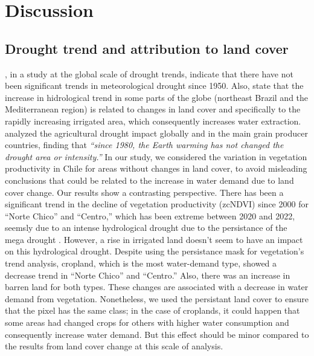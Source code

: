 \documentclass[
  authoryear,
  preprint,
  3p,
  onecolumn]{elsarticle}
\begin{document}
\hypertarget{discussion}{%
\section{Discussion}\label{discussion}}

\hypertarget{drought-trend-and-attribution-to-land-cover}{%
\subsection{Drought trend and attribution to land
cover}\label{drought-trend-and-attribution-to-land-cover}}

\citet{Vicente-Serrano2022}, in a study at the global scale of drought
trends, indicate that there have not been significant trends in
meteorological drought since 1950. Also, state that the increase in
hidrological trend in some parts of the globe (northeast Brazil and the
Mediterranean region) is related to changes in land cover and
specifically to the rapidly increasing irrigated area, which
consequently increases water extraction. \citet{Kogan2020} analyzed the
agricultural drought impact globally and in the main grain producer
countries, finding that \emph{``since 1980, the Earth warming has not
changed the drought area or intensity.''} In our study, we considered
the variation in vegetation productivity in Chile for areas without
changes in land cover, to avoid misleading conclusions that could be
related to the increase in water demand due to land cover change. Our
results show a contrasting perspective. There has been a significant
trend in the decline of vegetation productivity (zcNDVI) since 2000 for
``Norte Chico'' and ``Centro,'' which has been extreme between 2020 and
2022, seemsly due to an intense hydrological drought due to the
persistance of the mega drought \citep{Garreaud2017}. However, a rise in
irrigated land doesn't seem to have an impact on this hydrological
drought. Despite using the persistance mask for vegetation's trend
analysis, cropland, which is the most water-demand type, showed a
decrease trend in ``Norte Chico'' and ``Centro.'' Also, there was an
increase in barren land for both types. These changes are associated
with a decrease in water demand from vegetation. Nonetheless, we used
the persistant land cover to ensure that the pixel has the same class;
in the case of croplands, it could happen that some areas had changed
crops for others with higher water consumption and consequently increase
water demand. But this effect should be minor compared to the results
from land cover change at this scale of analysis.
\end{document}
